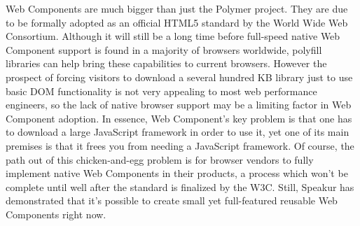 Web Components are much bigger than just the Polymer project.
They are due to be formally adopted as an official HTML5 standard by the World Wide Web Consortium.
Although it will still be a long time before full-speed native Web Component support is found in a majority of browsers worldwide, 
polyfill libraries can help bring these capabilities to current browsers.
However the prospect of forcing visitors to download a several hundred KB library just to use basic DOM functionality is not very appealing to most web performance engineers, 
so the lack of native browser support may be a limiting factor in Web Component adoption.
In essence, Web Component's key problem is that one has to download a large JavaScript framework in order to use it, 
yet one of its main premises is that it frees you from needing a JavaScript framework.
Of course, the path out of this chicken-and-egg problem is for browser vendors to fully implement native Web Components in their products,
a process which won't be complete until well after the standard is finalized by the W3C.
Still, Speakur has demonstrated that it's possible to create small yet full-featured reusable Web Components right now.
